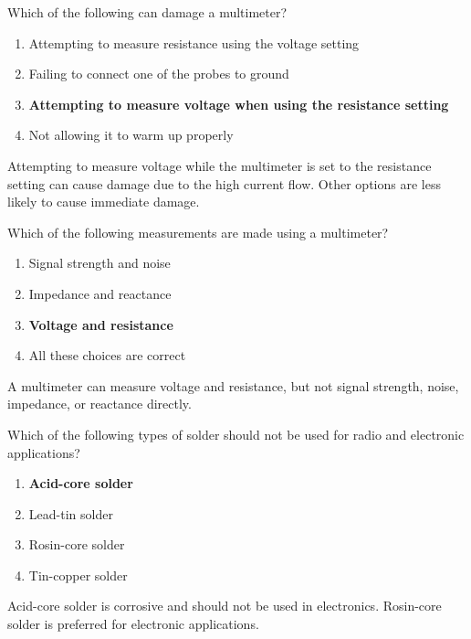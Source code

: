 \begin{tcolorbox}[colback=gray!10!white,colframe=black!75!black,title={T7D06}]
    Which of the following can damage a multimeter?
    \begin{enumerate}[label=\Alph*,noitemsep]
        \item Attempting to measure resistance using the voltage setting
        \item Failing to connect one of the probes to ground
        \item \textbf{Attempting to measure voltage when using the resistance setting}
        \item Not allowing it to warm up properly
    \end{enumerate}
\end{tcolorbox}
Attempting to measure voltage while the multimeter is set to the resistance setting can cause damage due to the high current flow. Other options are less likely to cause immediate damage.

\begin{tcolorbox}[colback=gray!10!white,colframe=black!75!black,title={T7D07}]
    Which of the following measurements are made using a multimeter?
    \begin{enumerate}[label=\Alph*,noitemsep]
        \item Signal strength and noise
        \item Impedance and reactance
        \item \textbf{Voltage and resistance}
        \item All these choices are correct
    \end{enumerate}
\end{tcolorbox}
A multimeter can measure voltage and resistance, but not signal strength, noise, impedance, or reactance directly.

\begin{tcolorbox}[colback=gray!10!white,colframe=black!75!black,title={T7D08}]
    Which of the following types of solder should not be used for radio and electronic applications?
    \begin{enumerate}[label=\Alph*,noitemsep]
        \item \textbf{Acid-core solder}
        \item Lead-tin solder
        \item Rosin-core solder
        \item Tin-copper solder
    \end{enumerate}
\end{tcolorbox}
Acid-core solder is corrosive and should not be used in electronics. Rosin-core solder is preferred for electronic applications.

